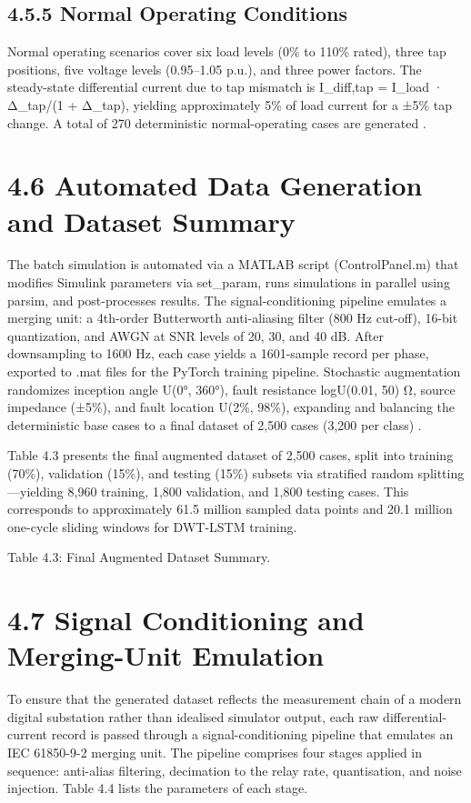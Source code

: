 \subsection{4.5.5  Normal Operating Conditions}
Normal operating scenarios cover six load levels (0\% to 110\% rated), three tap positions, five voltage levels (0.95--1.05 p.u.), and three power factors. The steady-state differential current due to tap mismatch is I\_diff,tap = I\_load · Δ\_tap/(1 + Δ\_tap), yielding approximately 5\% of load current for a ±5\% tap change. A total of 270 deterministic normal-operating cases are generated \cite{ref15}.


\section{4.6  Automated Data Generation and Dataset Summary}
The batch simulation is automated via a MATLAB script (ControlPanel.m) that modifies Simulink parameters via set\_param, runs simulations in parallel using parsim, and post-processes results. The signal-conditioning pipeline emulates a merging unit: a 4th-order Butterworth anti-aliasing filter (800 Hz cut-off), 16-bit quantization, and AWGN at SNR levels of 20, 30, and 40 dB. After downsampling to 1600 Hz, each case yields a 1601-sample record per phase, exported to .mat files for the PyTorch training pipeline. Stochastic augmentation randomizes inception angle U(0°, 360°), fault resistance logU(0.01, 50) Ω, source impedance (±5\%), and fault location U(2\%, 98\%), expanding and balancing the deterministic base cases to a final dataset of 2,500 cases (3,200 per class) \cite{ref16}.

Table 4.3 presents the final augmented dataset of 2,500 cases, split into training (70\%), validation (15\%), and testing (15\%) subsets via stratified random splitting---yielding 8,960 training, 1,800 validation, and 1,800 testing cases. This corresponds to approximately 61.5 million sampled data points and 20.1 million one-cycle sliding windows for DWT-LSTM training.

Table 4.3: Final Augmented Dataset Summary.


\section{4.7  Signal Conditioning and Merging-Unit Emulation}
To ensure that the generated dataset reflects the measurement chain of a modern digital substation rather than idealised simulator output, each raw differential-current record is passed through a signal-conditioning pipeline that emulates an IEC 61850-9-2 merging unit. The pipeline comprises four stages applied in sequence: anti-alias filtering, decimation to the relay rate, quantisation, and noise injection. Table 4.4 lists the parameters of each stage.

